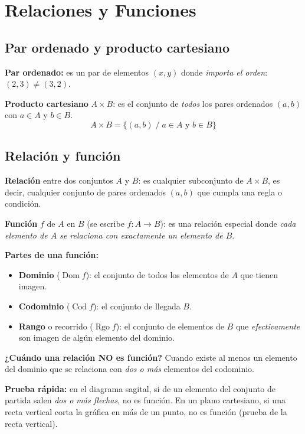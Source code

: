 \documentclass[12pt, letterpaper]{article}
\begin{document}
\section{Relaciones y Funciones}

\subsection{Par ordenado y producto cartesiano}

\begin{cuadroteoria}
  \textbf{Par ordenado:} es un par de elementos $(x, y)$ donde \emph{importa el orden}: $(2, 3) \neq (3, 2)$.

  \textbf{Producto cartesiano} $A \times B$: es el conjunto de \emph{todos} los pares ordenados $(a, b)$ con $a \in A$ y $b \in B$.
  $$A \times B = \{(a, b) \;/\; a \in A \text{ y } b \in B\}$$
\end{cuadroteoria}

\subsection{Relación y función}

\begin{cuadroteoria}
  \textbf{Relación} entre dos conjuntos $A$ y $B$: es cualquier subconjunto de $A \times B$, es decir, cualquier conjunto de pares ordenados $(a, b)$ que cumpla una regla o condición.

  \textbf{Función} $f$ de $A$ en $B$ (se escribe $f: A \rightarrow B$): es una relación especial donde \emph{cada elemento de $A$ se relaciona con exactamente un elemento de $B$}.

  \textbf{Partes de una función:}
  \begin{itemize}[leftmargin=*]
    \item \textbf{Dominio} ($\operatorname{Dom} f$): el conjunto de todos los elementos de $A$ que tienen imagen.
    \item \textbf{Codominio} ($\operatorname{Cod} f$): el conjunto de llegada $B$.
    \item \textbf{Rango} o recorrido ($\operatorname{Rgo} f$): el conjunto de elementos de $B$ que \emph{efectivamente} son imagen de algún elemento del dominio.
  \end{itemize}
\end{cuadroteoria}

\begin{cuadroadvertencia}
  \textbf{¿Cuándo una relación NO es función?} Cuando existe al menos un elemento del dominio que se relaciona con \emph{dos o más} elementos del codominio.

  \textbf{Prueba rápida:} en el diagrama sagital, si de un elemento del conjunto de partida salen \emph{dos o más flechas}, no es función. En un plano cartesiano, si una recta vertical corta la gráfica en más de un punto, no es función (prueba de la recta vertical).
\end{cuadroadvertencia}
\end{document}
